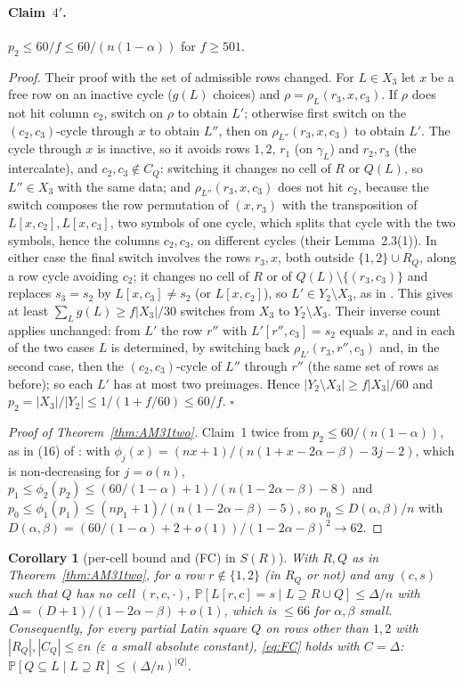 \documentclass[11pt]{article}
\newtheorem{corollary}[theorem]{Corollary}
\theoremstyle{definition}
\renewcommand{\Pr}{\mathbb{P}}
\begin{document}
\paragraph{Claim~$4'$.}  $p_2\le60/f\le60/(n(1-\alpha))$ for $f\ge501$.

\emph{Proof.}  Their proof with the set of admissible rows changed.  For $L\in X_3$ let
$x$ be a free row on an inactive cycle ($g(L)$ choices) and $\rho=\rho_L(r_3,x,c_3)$.  If
$\rho$ does not hit column $c_2$, switch on $\rho$ to obtain $L'$; otherwise first switch
on the $(c_2,c_3)$-cycle through $x$ to obtain $L''$, then on $\rho_{L''}(r_3,x,c_3)$ to
obtain $L'$.  The cycle through $x$ is inactive, so it avoids rows $1,2$, $r_1$ (on
$\gamma_L$) and $r_2,r_3$ (the intercalate), and $c_2,c_3\notin C_Q$: switching it changes
no cell of $R$ or $Q(L)$, so $L''\in X_3$ with the same data; and $\rho_{L''}(r_3,x,c_3)$
does not hit $c_2$, because the switch composes the row permutation of $(x,r_3)$ with the
transposition of $L[x,c_2],L[x,c_3]$, two symbols of one cycle, which splits that cycle
with the two symbols, hence the columns $c_2,c_3$, on different cycles (their
Lemma~2.3(1)).  In either case the final switch involves the rows $r_3,x$, both outside
$\{1,2\}\cup R_Q$, along a row cycle avoiding $c_2$; it changes no cell of $R$ or of
$Q(L)\setminus\{(r_3,c_3)\}$ and replaces $s_3=s_2$ by $L[x,c_3]\ne s_2$ (or $L[x,c_2]$),
so $L'\in Y_2\setminus X_3$, as in \cite{AM26}.  This gives at least $\sum_Lg(L)\ge f|X_3|/30$
switches from $X_3$ to $Y_2\setminus X_3$.  Their inverse count applies unchanged: from
$L'$ the row $r''$ with $L'[r'',c_3]=s_2$ equals $x$, and in each of the two cases $L$ is
determined, by switching back $\rho_{L'}(r_3,r'',c_3)$ and, in the second case, then the
$(c_2,c_3)$-cycle of $L''$ through $r''$ (the same set of rows as before); so each $L'$ has
at most two preimages.  Hence $|Y_2\setminus X_3|\ge f|X_3|/60$ and
$p_2=|X_3|/|Y_2|\le1/(1+f/60)\le60/f$.  $\square$

\begin{proof}[Proof of Theorem~\ref{thm:AM31two}]
Claim~1 twice from $p_2\le60/(n(1-\alpha))$, as in (16) of \cite{AM26}: with
$\phi_j(x)=(nx+1)/(n(1+x-2\alpha-\beta)-3j-2)$, which is non-decreasing for $j=o(n)$,
$p_1\le\phi_2(p_2)\le(60/(1-\alpha)+1)/(n(1-2\alpha-\beta)-8)$ and
$p_0\le\phi_1(p_1)\le(np_1+1)/(n(1-2\alpha-\beta)-5)$, so $p_0\le D(\alpha,\beta)/n$ with
$D(\alpha,\beta)=(60/(1-\alpha)+2+o(1))/(1-2\alpha-\beta)^2\to62$.
\end{proof}

\begin{corollary}[per-cell bound and (FC) in $S(R)$]\label{cor:FCtwo}
With $R,Q$ as in Theorem~\ref{thm:AM31two}, for a row $r\notin\{1,2\}$ (in $R_Q$ or not) and
any $(c,s)$ such that $Q$ has no cell $(r,c,\cdot)$,
$\Pr[L[r,c]=s\mid L\supseteq R\cup Q]\le\Delta/n$ with $\Delta=(D+1)/(1-2\alpha-\beta)+o(1)$,
which is $\le66$ for $\alpha,\beta$ small.  Consequently, for every partial Latin square
$Q$ on rows other than $1,2$ with $|R_Q|,|C_Q|\le\varepsilon n$ ($\varepsilon$ a small
absolute constant), \eqref{eq:FC} holds with $C=\Delta$:
$\Pr[Q\subseteq L\mid L\supseteq R]\le(\Delta/n)^{|Q|}$.
\end{corollary}
\end{document}
